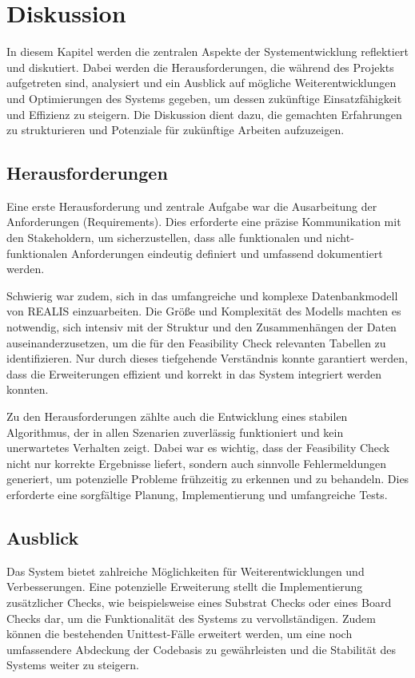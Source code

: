 \chapter{Diskussion}
In diesem Kapitel werden die zentralen Aspekte der Systementwicklung reflektiert und diskutiert. Dabei werden die Herausforderungen, die während des Projekts aufgetreten sind, analysiert und ein Ausblick auf mögliche Weiterentwicklungen und Optimierungen des Systems gegeben, um dessen zukünftige Einsatzfähigkeit und Effizienz zu steigern. Die Diskussion dient dazu, die gemachten Erfahrungen zu strukturieren und Potenziale für zukünftige Arbeiten aufzuzeigen.
\section{Herausforderungen}

Eine erste Herausforderung und zentrale Aufgabe war die Ausarbeitung der Anforderungen (Requirements). Dies erforderte eine präzise Kommunikation mit den Stake\-holdern, um sicherzustellen, dass alle funktionalen und nicht-funktionalen Anforderungen eindeutig definiert und umfassend dokumentiert werden. 

Schwierig war zudem, sich in das umfangreiche und komplexe Datenbankmodell von \gls{REALIS} einzuarbeiten. Die Größe und Komplexität des Modells machten es notwendig, sich intensiv mit der Struktur und den Zusammenhängen der Daten auseinanderzusetzen, um die für den Feasibility Check relevanten Tabellen zu identifizieren. Nur durch dieses tiefgehende Verständnis konnte garantiert werden, dass die Erweiterungen effizient und korrekt in das System integriert werden konnten.

Zu den Herausforderungen zählte auch die Entwicklung eines stabilen Algorithmus, der in allen Szenarien zuverlässig funktioniert und kein unerwartetes Verhalten zeigt. Dabei war es wichtig, dass der Feasibility Check nicht nur korrekte Ergebnisse liefert, sondern auch sinnvolle Fehlermeldungen generiert, um potenzielle Probleme frühzeitig zu erkennen und zu behandeln. Dies erforderte eine sorgfältige Planung, Implementierung und umfangreiche Tests.

\section{Ausblick}

Das System bietet zahlreiche Möglichkeiten für Weiterentwicklungen und Verbesserungen. Eine potenzielle Erweiterung stellt die Implementierung zusätzlicher Checks, wie beispielsweise eines Substrat Checks oder eines Board Checks dar, um die Funktionalität des Systems zu vervollständigen. Zudem können die bestehenden Unittest-Fälle erweitert werden, um eine noch umfassendere Abdeckung der Codebasis zu gewährleisten und die Stabilität des Systems weiter zu steigern.

